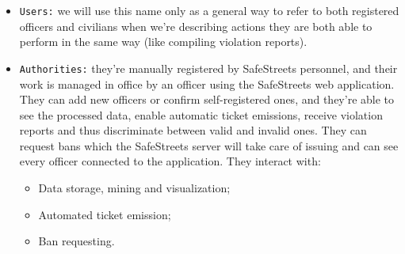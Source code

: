\documentclass[12pt,a4paper]{article}
\begin{document}
\begin{itemize}
\item \texttt{Users:} we will use this name only as a general way to refer to both registered officers and civilians when we're describing actions they are both able to perform in the same way (like compiling violation reports).
\newpage
\item  \texttt{Authorities:} they're manually registered by SafeStreets personnel, and their work is managed in office by an officer using the SafeStreets web application. They can add new officers or confirm self-registered ones, and they're able to see the processed data, enable automatic ticket emissions, receive violation reports and thus discriminate between valid and invalid ones. They can request bans which the SafeStreets server will take care of issuing and can see every officer connected to the application. They interact with: 
		\begin{itemize}
			\item Data storage, mining and visualization;
			\item Automated ticket emission;
			\item Ban requesting.
		\end{itemize}

\end{itemize}
\end{document}
